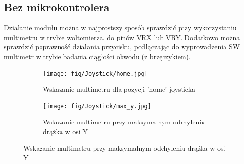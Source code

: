 \documentclass[11pt, a4paper]{article}
\begin{document}
\subsection{Bez mikrokontrolera}
Działanie modułu można w najprostszy sposób sprawdzić przy wykorzystaniu multimetru w trybie woltomierza, do pinów VRX lub VRY. Dodatkowo można sprawdzić poprawność działania przycisku, podłączając do wyprowadzenia SW multimetr w trybie badania ciągłości obwodu (z brzęczykiem).
\vspace{0.5cm}
\vspace{0.25cm}
\begin{figure}[h]
\centering
\begin{subfigure}{.5\textwidth}
\centering
\texttt{[image: fig/Joystick/home.jpg]}
\caption{\centering Wskazanie multimetru dla pozycji 'home' joysticka}
\label{fig:_uklad_woltomierz_otw}
\end{subfigure}%
\begin{subfigure}{.5\textwidth}
\centering
\texttt{[image: fig/Joystick/max\_y.jpg]}
\caption{\centering Wskazanie multimetru przy maksymalnym odchyleniu drążka w osi Y}
\label{fig:_uklad_woltomierz_zmk}
\end{subfigure}
\label{fig:woltomierz}
\end{figure}
\vspace{0.25cm}
\vspace{0.5cm}
\end{document}
